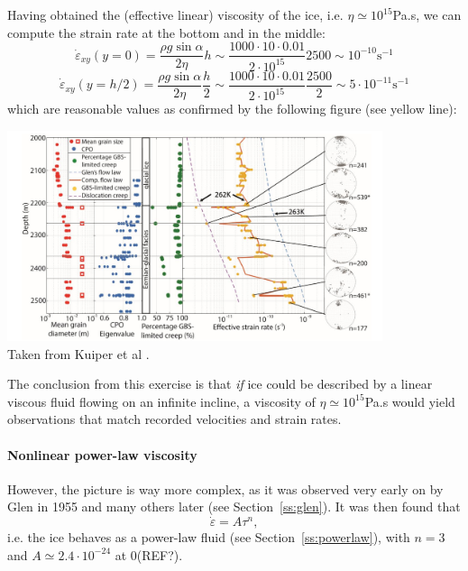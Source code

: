 Having obtained the (effective linear) viscosity of the ice, i.e. $\eta\simeq 10^{15}$Pa.s,
we can compute the strain rate at the bottom and in the middle:
\[
\dot{\varepsilon}_{xy}(y=0) 
= \frac{\rho g \sin \alpha}{2 \eta} h
\sim \frac{1000\cdot 10 \cdot 0.01}{2 \cdot 10^{15}}2500
\sim 10^{-10}\text{s}^{-1}
\]
\[
\dot{\varepsilon}_{xy}(y=h/2) 
= \frac{\rho g \sin \alpha}{2 \eta} \frac{h}{2}
\sim \frac{1000\cdot 10 \cdot 0.01}{2 \cdot 10^{15}}\frac{2500}{2}
\sim 5\cdot 10^{-11}\text{s}^{-1}
\]
which are reasonable values as confirmed by the following figure (see yellow line):  
\begin{center}
\includegraphics[width=11cm]{python_codes/fieldstone_59/images/kudd19}\\
{\captionfont Taken from Kuiper et al \cite{kudd19}.}
\end{center}

The conclusion from this exercise is that {\sl if} ice could be described by 
a linear viscous fluid flowing on an infinite incline, a viscosity of $\eta\simeq 10^{15}$Pa.s
would yield observations that match recorded velocities and strain rates. 


\paragraph{Nonlinear power-law viscosity}
However, the picture is way more complex, as it was observed very early on 
by Glen in 1955 \cite{glen55} and many others later (see Section~\ref{ss:glen}). 
It was then found that 
\[
\dot{\varepsilon} = A \tau^n,
\]
i.e. the ice behaves as a power-law fluid (see Section~\ref{ss:powerlaw}), with 
$n=3$ and $A\simeq 2.4\cdot 10^{-24}$ at 0\degree (REF?).

